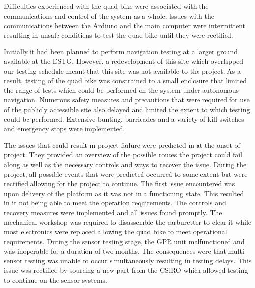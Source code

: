 \documentclass[main.tex]{subfiles}
\begin{document}
Difficulties experienced with the quad bike were associated with the communications and control of the system as a whole. Issues with the communications between the Ardiuno and the main computer were intermittent resulting in unsafe conditions to test the quad bike until they were rectified.

Initially it had been planned to perform navigation testing at a larger ground available at the DSTG. However, a redevelopment of this site which overlapped our testing schedule meant that this site was not available to the project. As a result, testing of the quad bike was constrained to a small enclosure that limited the range of tests which could be performed on the system under autonomous navigation. Numerous safety measures and precautions that were required for use of the publicly accessible site also delayed and limited the extent to which testing could be performed. Extensive bunting, barricades and a variety of kill switches and emergency stops were implemented.

The issues that could result in project failure were predicted in  at the onset of project. They provided an overview of the possible routes the project could fail along as well as the necessary controls and ways to recover the issue. 
During the project, all possible events that were predicted occurred to some extent but were rectified allowing for the project to continue. 
The first issue encountered was upon delivery of the platform as it was not in a functioning state. This resulted in it not being able to meet the operation requirements. The controls and recovery measures were implemented and all issues found promptly. The mechanical workshop was required to disassemble the carburettor to clear it while most electronics were replaced allowing the quad bike to meet operational requirements.
During the sensor testing stage, the GPR unit malfunctioned and was inoperable for a duration of two months. The consequences were that multi sensor testing  was unable to occur simultaneously resulting in testing delays. 
This issue was rectified by sourcing a new part from the CSIRO which allowed testing to continue on the sensor systems.
\end{document}
